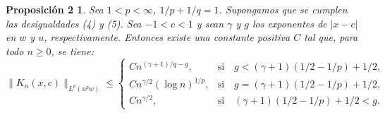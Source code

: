 \documentclass[a4paper,12pt]{article}
\theoremstyle{plain}
\newtheorem*{propTwo}{Proposici\'on 2}
\theoremstyle{definition}
\begin{document}
\begin{propTwo}
Sea $1 < p < \infty$, $1/p + 1/q = 1$.
Supongamos que se cumplen las desigualdades (4) y (5). Sea $-1 < c < 1$
y sean $\gamma$ y $g$ los exponentes de $| x - c |$
en $w$ y $u$, respectivamente. Entonces existe una constante positiva
$C$ tal que, para todo $n \geq 0$, se tiene:
$$
\| K_{n}(x,c) \|_{L^{p}(u^{p}w)}
\leq
\begin{cases}
C n^{(\gamma+1)/q - g}, &\text{si}\quad g < (\gamma +1) (1/2 - 1/p) + 1/2,\\
C n^{\gamma/2} (\log n)^{1/p}, &\text{si}\quad g = (\gamma +1) (1/2 - 1/p) + 1/2,\\
C n^{\gamma/2}, &\text{si}\quad (\gamma +1) (1/2 - 1/p) + 1/2 < g.
\end{cases}
$$
\end{propTwo}
\end{document}
